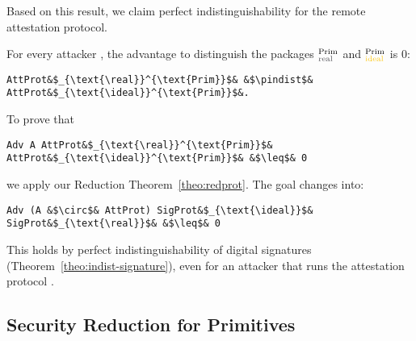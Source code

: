 %
Based on this result, we claim
perfect indistinguishability for the 
remote attestation protocol.
%
\begin{theorem}\label{theo:indist-ra}
  For every attacker \A, the advantage to distinguish the packages
  \pattprot$_{\text{\real}}^{\text{Prim}}$ and \pattprot$_{\text{\ideal}}^{\text{Prim}}$ is $0$:
     \begin{center}
        \begin{minipage}{0.5\columnwidth}
    \begin{verbatim}
AttProt&$_{\text{\real}}^{\text{Prim}}$& &$\pindist$& AttProt&$_{\text{\ideal}}^{\text{Prim}}$&.
    \end{verbatim}
    \end{minipage}
    \end{center}
\end{theorem}
%
\begin{IEEEproof}
    To prove that
    \begin{verbatim}
Adv A AttProt&$_{\text{\real}}^{\text{Prim}}$& AttProt&$_{\text{\ideal}}^{\text{Prim}}$& &$\leq$& 0

    \end{verbatim}
    we apply our 
    Reduction Theorem~\ref{theo:redprot}.
    The goal changes into:
     \begin{verbatim}
Adv (A &$\circ$& AttProt) SigProt&$_{\text{\ideal}}$& SigProt&$_{\text{\real}}$& &$\leq$& 0
    \end{verbatim}
    This holds by perfect indistinguishability
    of digital signatures (Theorem~\ref{theo:indist-signature}),
    even for an attacker \A{} that runs the
    attestation protocol \pattprot.
\end{IEEEproof}

\subsection{Security Reduction for Primitives}
\label{sec:coll}


